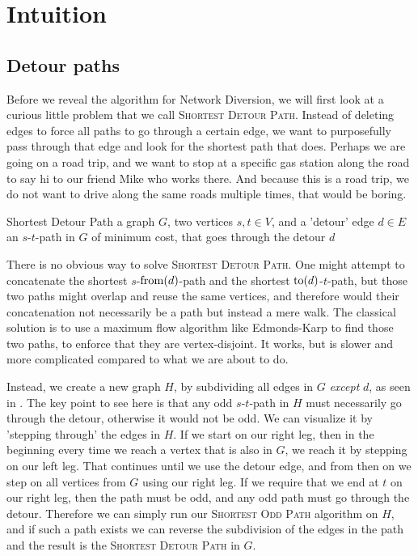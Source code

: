 \section{Intuition}
\subsection{Detour paths}
\label{section:subdividing-detours}
Before we reveal the algorithm for Network Diversion, we will first look at a curious little problem that we call \textsc{Shortest Detour Path}. Instead of deleting edges to force all paths to go through a certain edge, we want to purposefully pass through that edge and look for the shortest path that does. Perhaps we are going on a road trip, and we want to stop at a specific gas station along the road to say hi to our friend Mike who works there. And because this is a road trip, we do not want to drive along the same roads multiple times, that would be boring.

\problem
{Shortest Detour Path}
{a graph $G$, two vertices $s,t \in V$, and a 'detour' edge $d \in E$}
{an $s$-$t$-path in $G$ of minimum cost, that goes through the detour $d$}

There is no obvious way to solve \textsc{Shortest Detour Path}. One might attempt to concatenate the shortest $s$-$\operatorname{from}(d)$-path and the shortest $\operatorname{to}(d)$-$t$-path, but those two paths might overlap and reuse the same vertices, and therefore would their concatenation not necessarily be a path but instead a mere walk. The classical solution is to use a maximum flow algorithm like Edmonds-Karp \cite{source:edmonds-karp-algorithn} to find those two paths, to enforce that they are vertex-disjoint. It works, but is slower and more complicated compared to what we are about to do.

Instead, we create a new graph $H$, by subdividing all edges in $G$ \emph{except} $d$, as seen in . The key point to see here is that any odd $s$-$t$-path in $H$ must necessarily go through the detour, otherwise it would not be odd. We can visualize it by 'stepping through' the edges in $H$. If we start on our right leg, then in the beginning every time we reach a vertex that is also in $G$, we reach it by stepping on our left leg. That continues until we use the detour edge, and from then on we step on all vertices from $G$ using our right leg. If we require that we end at $t$ on our right leg, then the path must be odd, and any odd path must go through the detour. Therefore we can simply run our \textsc{Shortest Odd Path} algorithm on $H$, and if such a path exists we can reverse the subdivision of the edges in the path and the result is the \textsc{Shortest Detour Path} in $G$.

